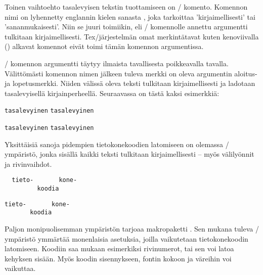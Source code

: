 Toinen vaihtoehto tasalevyisen tekstin tuottamiseen on
\-/ komento. Komennon nimi on lyhennetty englannin kielen
sanasta \textit{}, joka tarkoittaa 'kirjaimellisesti'
tai 'sananmukaisesti'. Niin se juuri toimiikin, eli \-/
komennolle annettu argumentti tulkitaan kirjaimellisesti.
Tex\-/järjestelmän omat merkintätavat kuten kenoviivalla (\koodi{\keno})
alkavat komennot eivät toimi tämän komennon argumentissa.

\-/ komennon argumentti täytyy ilmaista tavallisesta
poikkeavalla tavalla. Välittömästi komennon nimen jälkeen tuleva merkki
on oleva argumentin aloitus- ja lopetusmerkki. Niiden välissä oleva
teksti tulkitaan kirjaimellisesti ja ladotaan tasalevyisellä
kirjainperheellä. Seuraavassa on tästä kaksi esimerkkiä:

\begin{koodilohkosis}
  \verb.tasalevyinen.   %
  \verb|tasalevyinen|   %
\end{koodilohkosis}

\begin{tulossis}
  \verb.tasalevyinen.
  \verb|tasalevyinen|
\end{tulossis}

Yksittäisiä sanoja pidempien tietokonekoodien latomiseen on olemassa
\-/ ympäristö, jonka sisällä kaikki teksti
tulkitaan kirjaimellisesti -- myös välilyönnit ja rivinvaihdot.

\begin{koodilohkosis}
  \begin{verbatim}
  tieto-       kone-
         koodia
  \end{verbatim}
\end{koodilohkosis}

\begin{tulossis}
\begin{verbatim}
tieto-       kone-
       koodia
\end{verbatim}
\end{tulossis}

Paljon monipuolisemman ympäristön tarjoaa makropaketti
. Sen mukana tuleva
\-/ ympäristö ymmärtää monenlaisia asetuksia,
joilla vaikutetaan tietokonekoodin latomiseen. Koodiin saa mukaan
esimerkiksi rivinumerot, tai sen voi latoa kehyksen sisään. Myös koodin
sisennykseen, fontin kokoon ja väreihin voi vaikuttaa.

